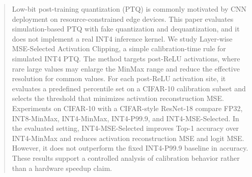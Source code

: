 
\begin{abstract}
Low-bit post-training quantization (PTQ) is commonly motivated by CNN deployment on resource-constrained edge devices. This paper evaluates simulation-based PTQ with fake quantization and dequantization, and it does not implement a real INT4 inference kernel. We study Layer-wise MSE-Selected Activation Clipping, a simple calibration-time rule for simulated INT4 PTQ. The method targets post-ReLU activations, where rare large values may enlarge the MinMax range and reduce the effective resolution for common values. For each post-ReLU activation site, it evaluates a predefined percentile set on a CIFAR-10 calibration subset and selects the threshold that minimizes activation reconstruction MSE. Experiments on CIFAR-10 with a CIFAR-style ResNet-18 compare FP32, INT8-MinMax, INT4-MinMax, INT4-P99.9, and INT4-MSE-Selected. In the evaluated setting, INT4-MSE-Selected improves Top-1 accuracy over INT4-MinMax and reduces activation reconstruction MSE and logit MSE. However, it does not outperform the fixed INT4-P99.9 baseline in accuracy. These results support a controlled analysis of calibration behavior rather than a hardware speedup claim.
\end{abstract}

